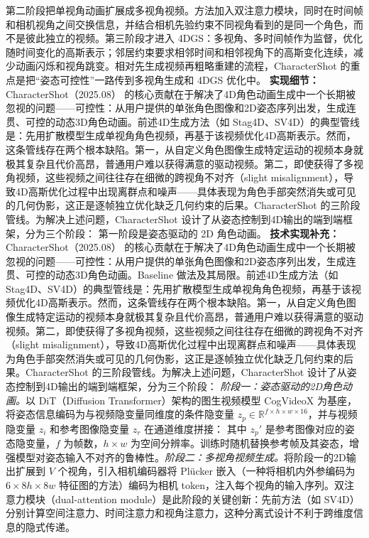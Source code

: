 第二阶段把单视角动画扩展成多视角视频。方法加入双注意力模块，同时在时间帧和相机视角之间交换信息，并结合相机先验约束不同视角看到的是同一个角色，而不是彼此独立的视频。第三阶段才进入 4DGS：多视角、多时间帧作为监督，优化随时间变化的高斯表示；邻居约束要求相邻时间和相邻视角下的高斯变化连续，减少动画闪烁和视角跳变。相对先生成视频再粗略重建的流程，CharacterShot 的重点是把“姿态可控性”一路传到多视角生成和 4DGS 优化中。
\textbf{实现细节：} CharacterShot（2025.08） 的核心贡献在于解决了4D角色动画生成中一个长期被忽视的问题——可控性：从用户提供的单张角色图像和2D姿态序列出发，生成连贯、可控的动态3D角色动画。前述4D生成方法（如 Stag4D、SV4D）的典型管线是：先用扩散模型生成单视角角色视频，再基于该视频优化4D高斯表示。然而，这条管线存在两个根本缺陷。第一，从自定义角色图像生成特定运动的视频本身就极其复杂且代价高昂，普通用户难以获得满意的驱动视频。第二，即使获得了多视角视频，这些视频之间往往存在细微的跨视角不对齐（slight misalignment），导致4D高斯优化过程中出现离群点和噪声——具体表现为角色手部突然消失或可见的几何伪影，这正是逐帧独立优化缺乏几何约束的后果。CharacterShot 的三阶段管线。为解决上述问题，CharacterShot 设计了从姿态控制到4D输出的端到端框架，分为三个阶段： 第一阶段是姿态驱动的 2D 角色动画。
\textbf{技术实现补充：} CharacterShot（2025.08） 的核心贡献在于解决了4D角色动画生成中一个长期被忽视的问题——可控性：从用户提供的单张角色图像和2D姿态序列出发，生成连贯、可控的动态3D角色动画。Baseline 做法及其局限。前述4D生成方法（如 Stag4D、SV4D）的典型管线是：先用扩散模型生成单视角角色视频，再基于该视频优化4D高斯表示。然而，这条管线存在两个根本缺陷。第一，从自定义角色图像生成特定运动的视频本身就极其复杂且代价高昂，普通用户难以获得满意的驱动视频。第二，即使获得了多视角视频，这些视频之间往往存在细微的跨视角不对齐（slight misalignment），导致4D高斯优化过程中出现离群点和噪声——具体表现为角色手部突然消失或可见的几何伪影，这正是逐帧独立优化缺乏几何约束的后果。CharacterShot 的三阶段管线。为解决上述问题，CharacterShot 设计了从姿态控制到4D输出的端到端框架，分为三个阶段： \textit{阶段一：姿态驱动的2D角色动画。}以 DiT（Diffusion Transformer）架构的图生视频模型 CogVideoX 为基座，将姿态信息编码为与视频隐变量同维度的条件隐变量 $z_p \in \mathbb{R}^{f \times h \times w \times 16}$，并与视频隐变量 $z_i$ 和参考图像隐变量 $z_r$ 在通道维度拼接： 其中 $z_p'$ 是参考图像对应的姿态隐变量，$f$ 为帧数，$h \times w$ 为空间分辨率。训练时随机替换参考帧及其姿态，增强模型对姿态输入不对齐的鲁棒性。\textit{阶段二：多视角视频生成。}将阶段一的2D输出扩展到 $V$ 个视角，引入相机编码器将 Pl\"ucker 嵌入（一种将相机内外参编码为 $6 \times 8h \times 8w$ 特征图的方法）编码为相机 token，注入每个视角的输入序列。双注意力模块（dual-attention module）是此阶段的关键创新：先前方法（如 SV4D）分别计算空间注意力、时间注意力和视角注意力，这种分离式设计不利于跨维度信息的隐式传递。
